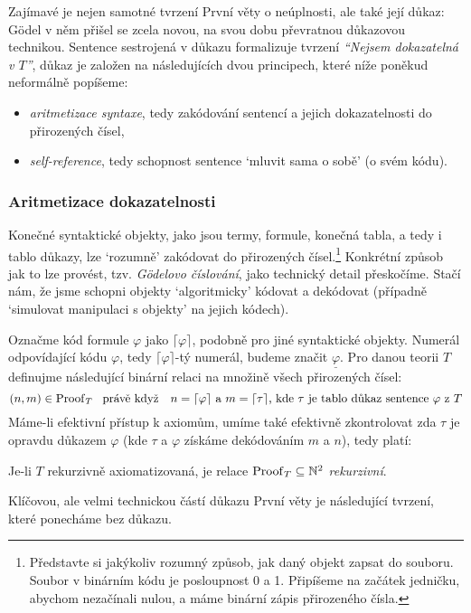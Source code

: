 Zajímavé je nejen samotné tvrzení První věty o neúplnosti, ale také její důkaz: Gödel v něm přišel se zcela novou, na svou dobu převratnou důkazovou technikou. Sentence sestrojená v důkazu formalizuje tvrzení \emph{``Nejsem dokazatelná v $T$''}, důkaz je založen na následujících dvou principech, které níže poněkud neformálně popíšeme:
\begin{itemize}
    \item \emph{aritmetizace syntaxe}, tedy zakódování sentencí a jejich dokazatelnosti do přirozených čísel,
    \item \emph{self-reference}, tedy schopnost sentence `mluvit sama o sobě' (o svém kódu).
\end{itemize}

\subsubsection*{Aritmetizace dokazatelnosti}

Konečné syntaktické objekty, jako jsou termy, formule, konečná tabla, a tedy i tablo důkazy, lze `rozumně' zakódovat do přirozených čísel.\footnote{Představte si jakýkoliv rozumný způsob, jak daný objekt zapsat do souboru. Soubor v binárním kódu je posloupnost 0 a 1. Připíšeme na začátek jedničku, abychom nezačínali nulou, a máme binární zápis přirozeného čísla.} Konkrétní způsob jak to lze provést, tzv. \emph{Gödelovo číslování}, jako technický detail přeskočíme. Stačí nám, že jsme schopni objekty `algoritmicky' kódovat a dekódovat (případně `simulovat manipulaci s objekty' na jejich kódech).

Označme kód formule $\varphi$ jako $\lceil\varphi\rceil$, podobně pro jiné syntaktické objekty. Numerál odpovídající kódu $\varphi$, tedy $\lceil\varphi\rceil$-tý numerál, budeme značit $\underline{\varphi}$. Pro danou teorii $T$ definujme následující binární relaci na množině všech přirozených čísel:
$$
(n,m)\in\Proof_T\ \text{ právě když \ \ $n=\lceil\varphi\rceil$ a $m=\lceil\tau\rceil$, kde $\tau$ je tablo důkaz sentence $\varphi$ z $T$}
$$
Máme-li efektivní přístup k axiomům, umíme také efektivně zkontrolovat zda $\tau$ je opravdu důkazem $\varphi$ (kde $\tau$ a $\varphi$ získáme dekódováním $m$ a $n$), tedy platí:
\begin{observation}
Je-li $T$ rekurzivně axiomatizovaná, je relace $\operatorname{Proof}_T\subseteq\mathbb N^2$ \emph{rekurzivní}. 
\end{observation}

Klíčovou, ale velmi technickou částí důkazu První věty je následující tvrzení, které ponecháme bez důkazu.


